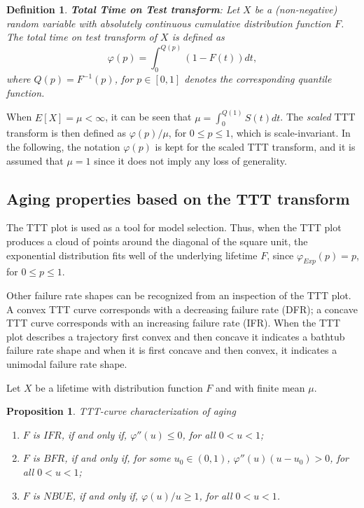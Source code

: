 \documentclass[preprint,12pt]{elsarticle}
\newtheorem{dfn}{{\sc Definition}}[section]
\newtheorem{prp}{{\sc Proposition}}[section]
\begin{document}
\begin{dfn}\textbf{Total Time on Test transform}: \label{ttt.def2} 
\noindent Let $X$ be a (non-negative) random variable with absolutely continuous cumulative distribution function $F$. The \textit{total time on test transform} of $X$ is defined as
\begin{equation} \label{ttt.curve}
\varphi(p) =\displaystyle{\int_0^{Q(p)}}\left(1-F(t)\right) dt,
\end{equation}
where $Q(p)= F^{-1}(p)$, for $p\in [0,1]$ denotes the corresponding quantile function.
\end{dfn}
When $E[X]=\mu < \infty$, it can be seen that $\mu=\int_0^{Q(1)} S(t)dt$. The {\textit{scaled}} TTT transform is then defined as $\varphi(p)/\mu$, for $0 \leq p \leq 1$,  which is scale-invariant. In the following, the notation $\varphi(p)$ is kept for the scaled TTT transform, and it is assumed that $\mu=1$ since it does not imply any loss of generality.


\subsection{Aging properties based on the TTT transform}\label{sec:aging}
%

The TTT plot is used as a tool for model selection. Thus, when the TTT plot produces a cloud of points around the diagonal of the square  unit, the exponential distribution fits well of the underlying lifetime $F$, since $\varphi_{Exp}(p)=p$, for $0 \leq p \leq 1$. 

Other failure rate shapes can be recognized from an inspection of the TTT plot. A convex TTT curve corresponds with a decreasing failure rate (DFR); a concave TTT curve corresponds with an increasing failure rate (IFR). When the TTT plot describes a trajectory first convex and then concave it indicates a bathtub failure rate shape and when it is first concave and then convex, it indicates a unimodal failure rate shape. 

Let $X$ be a lifetime with distribution function $F$ and with finite mean $\mu$. 

\begin{prp} {TTT-curve characterization of aging} \

\begin{enumerate}
\item $ F$ is $ IFR$, if and only if, $ \varphi'' (u) \leq  0$, for all $0 <u <1$;
\item $F$ is $BFR$, if and only if, for some $u_0 \in (0,1)$, $\varphi'' (u) (u-u_0) >0 $, for all $0 <u <1$;
\item $F$ is $ NBUE$, if and only if, $\varphi(u)/u \geq  1$, for all $0 <u <1$.
\end{enumerate}
 \end{prp}
\end{document}
